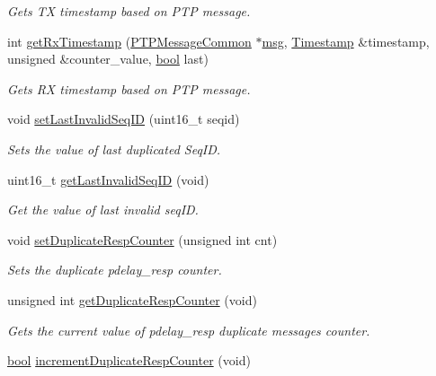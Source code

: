 \begin{DoxyCompactItemize}
\begin{DoxyCompactList}\small\item\em Gets TX timestamp based on P\+TP message. \end{DoxyCompactList}\item 
int \hyperlink{class_ether_port_a68497c63d582ed100222568a5c557c94}{get\+Rx\+Timestamp} (\hyperlink{class_p_t_p_message_common}{P\+T\+P\+Message\+Common} $\ast$\hyperlink{openavb__log_8c_a0c7e58a50354c4a4d6dad428d0e47029}{msg}, \hyperlink{class_timestamp}{Timestamp} \&timestamp, unsigned \&counter\+\_\+value, \hyperlink{avb__gptp_8h_af6a258d8f3ee5206d682d799316314b1}{bool} last)
\begin{DoxyCompactList}\small\item\em Gets RX timestamp based on P\+TP message. \end{DoxyCompactList}\item 
void \hyperlink{class_ether_port_a30d87a5a01194a4d4a26df42e1e2c8a8}{set\+Last\+Invalid\+Seq\+ID} (uint16\+\_\+t seqid)
\begin{DoxyCompactList}\small\item\em Sets the value of last duplicated Seq\+ID. \end{DoxyCompactList}\item 
uint16\+\_\+t \hyperlink{class_ether_port_afbd9c6b9136482c155a71352d04e8681}{get\+Last\+Invalid\+Seq\+ID} (void)
\begin{DoxyCompactList}\small\item\em Get the value of last invalid seq\+ID. \end{DoxyCompactList}\item 
void \hyperlink{class_ether_port_aac141da6f6017f733771a9110b04d0ba}{set\+Duplicate\+Resp\+Counter} (unsigned int cnt)
\begin{DoxyCompactList}\small\item\em Sets the duplicate pdelay\+\_\+resp counter. \end{DoxyCompactList}\item 
unsigned int \hyperlink{class_ether_port_ac927251aaee6968568592547a965d770}{get\+Duplicate\+Resp\+Counter} (void)
\begin{DoxyCompactList}\small\item\em Gets the current value of pdelay\+\_\+resp duplicate messages counter. \end{DoxyCompactList}\item 
\hyperlink{avb__gptp_8h_af6a258d8f3ee5206d682d799316314b1}{bool} \hyperlink{class_ether_port_ac787a8cc8531608165f2e56909a27adf}{increment\+Duplicate\+Resp\+Counter} (void)

\end{DoxyCompactItemize}
